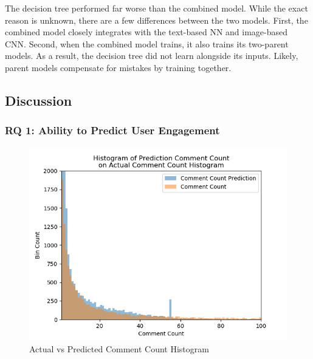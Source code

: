 \documentclass[mksc,blindrev]{informs3} %
\begin{document}
The decision tree performed far worse than the combined model. While the exact reason is unknown, there are a few differences between the two models. First, the combined model closely integrates with the text-based NN and image-based CNN. Second, when the combined model trains, it also trains its two-parent models. As a result, the decision tree did not learn alongside its inputs. Likely, parent models compensate for mistakes by training together.

\subsection{Discussion}

\subsubsection{RQ 1: Ability to Predict User Engagement}

\begin{figure}
\centering
\includegraphics[width=\columnwidth]{images/Comment_Count_Prediction_vs_Actual.png}
\caption{Actual vs Predicted Comment Count Histogram}
\label{comment_count_histogram}
\end{figure}
\end{document}
